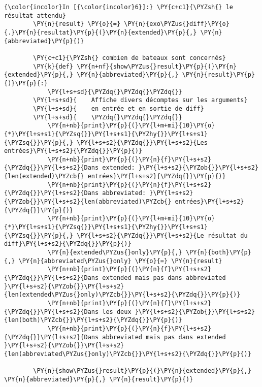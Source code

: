     \begin{Verbatim}[commandchars=\\\{\},frame=single,framerule=0.3mm,rulecolor=\color{cellframecolor}]
{\color{incolor}In [{\color{incolor}6}]:} \PY{c+c1}{\PYZsh{} le résultat attendu}
        \PY{n}{result} \PY{o}{=} \PY{n}{exo\PYZus{}diff}\PY{o}{.}\PY{n}{resultat}\PY{p}{(}\PY{n}{extended}\PY{p}{,} \PY{n}{abbreviated}\PY{p}{)}
        
        \PY{c+c1}{\PYZsh{} combien de bateaux sont concernés}
        \PY{k}{def} \PY{n+nf}{show\PYZus{}result}\PY{p}{(}\PY{n}{extended}\PY{p}{,} \PY{n}{abbreviated}\PY{p}{,} \PY{n}{result}\PY{p}{)}\PY{p}{:}
            \PY{l+s+sd}{\PYZdq{}\PYZdq{}\PYZdq{}}
        \PY{l+s+sd}{    Affiche divers décomptes sur les arguments}
        \PY{l+s+sd}{    en entrée et en sortie de diff}
        \PY{l+s+sd}{    \PYZdq{}\PYZdq{}\PYZdq{}}
            \PY{n+nb}{print}\PY{p}{(}\PY{l+m+mi}{10}\PY{o}{*}\PY{l+s+s1}{\PYZsq{}}\PY{l+s+s1}{\PYZhy{}}\PY{l+s+s1}{\PYZsq{}}\PY{p}{,} \PY{l+s+s2}{\PYZdq{}}\PY{l+s+s2}{Les entrées}\PY{l+s+s2}{\PYZdq{}}\PY{p}{)}
            \PY{n+nb}{print}\PY{p}{(}\PY{n}{f}\PY{l+s+s2}{\PYZdq{}}\PY{l+s+s2}{Dans extended: }\PY{l+s+s2}{\PYZob{}}\PY{l+s+s2}{len(extended)\PYZcb{} entrées}\PY{l+s+s2}{\PYZdq{}}\PY{p}{)}
            \PY{n+nb}{print}\PY{p}{(}\PY{n}{f}\PY{l+s+s2}{\PYZdq{}}\PY{l+s+s2}{Dans abbreviated: }\PY{l+s+s2}{\PYZob{}}\PY{l+s+s2}{len(abbreviated)\PYZcb{} entrées}\PY{l+s+s2}{\PYZdq{}}\PY{p}{)}
            \PY{n+nb}{print}\PY{p}{(}\PY{l+m+mi}{10}\PY{o}{*}\PY{l+s+s1}{\PYZsq{}}\PY{l+s+s1}{\PYZhy{}}\PY{l+s+s1}{\PYZsq{}}\PY{p}{,} \PY{l+s+s2}{\PYZdq{}}\PY{l+s+s2}{Le résultat du diff}\PY{l+s+s2}{\PYZdq{}}\PY{p}{)}
            \PY{n}{extended\PYZus{}only}\PY{p}{,} \PY{n}{both}\PY{p}{,} \PY{n}{abbreviated\PYZus{}only} \PY{o}{=} \PY{n}{result}
            \PY{n+nb}{print}\PY{p}{(}\PY{n}{f}\PY{l+s+s2}{\PYZdq{}}\PY{l+s+s2}{Dans extended mais pas dans abbreviated }\PY{l+s+s2}{\PYZob{}}\PY{l+s+s2}{len(extended\PYZus{}only)\PYZcb{}}\PY{l+s+s2}{\PYZdq{}}\PY{p}{)}
            \PY{n+nb}{print}\PY{p}{(}\PY{n}{f}\PY{l+s+s2}{\PYZdq{}}\PY{l+s+s2}{Dans les deux }\PY{l+s+s2}{\PYZob{}}\PY{l+s+s2}{len(both)\PYZcb{}}\PY{l+s+s2}{\PYZdq{}}\PY{p}{)}
            \PY{n+nb}{print}\PY{p}{(}\PY{n}{f}\PY{l+s+s2}{\PYZdq{}}\PY{l+s+s2}{Dans abbreviated mais pas dans extended }\PY{l+s+s2}{\PYZob{}}\PY{l+s+s2}{len(abbreviated\PYZus{}only)\PYZcb{}}\PY{l+s+s2}{\PYZdq{}}\PY{p}{)}
        
        \PY{n}{show\PYZus{}result}\PY{p}{(}\PY{n}{extended}\PY{p}{,} \PY{n}{abbreviated}\PY{p}{,} \PY{n}{result}\PY{p}{)}
\end{Verbatim}


